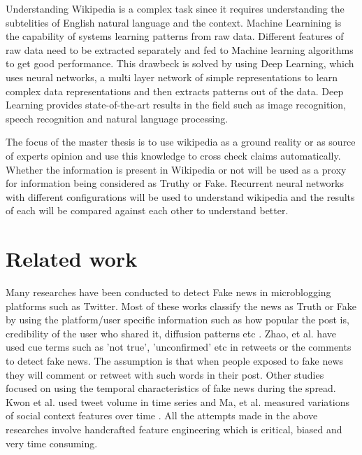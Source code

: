 \documentclass[a4paper, 11pt]{article}
\begin{document}
Understanding Wikipedia is a complex task since it requires understanding the subtelities of English natural language and the context. Machine Learnining is the capability of systems learning patterns from raw data. Different features of raw data need to be extracted separately and fed to Machine learning algorithms to get good performance. This drawbeck is solved by using Deep Learning, which uses neural networks, a multi layer network of simple representations to learn complex data representations and then extracts patterns out of the data. Deep Learning provides state-of-the-art results in the field such as image recognition, speech recognition and natural language processing\cite{Goodfellow2016}.

The focus of the master thesis is to use wikipedia as a ground reality or as source of experts opinion and use this knowledge to cross check claims automatically. Whether the information is present in Wikipedia or not will be used as a proxy for information being considered as Truthy or Fake. Recurrent neural networks with different configurations will be used to understand wikipedia and the results of each will be compared against each other to understand better.

\section{Related work}


Many researches have been conducted to detect Fake news in microblogging platforms such as Twitter. Most of these works classify the news as Truth or Fake by using the platform/user specific information such as how popular the post is, credibility of the user who shared it, diffusion patterns etc \cite{Liu2015} \cite{Ma2015}. Zhao, et al. have used cue terms such as 'not true', 'unconfirmed' etc in retweets or the comments to detect fake news. The assumption is that when people exposed to fake news they will comment or retweet with such words in their post\cite{Zhao2015}. Other studies focused on using the temporal characteristics of fake news during the spread. Kwon et al. used tweet volume in time series and Ma, et al. measured variations of social context features over time\cite{Kwon2013} \cite{Ma2015}. All the attempts made in the above researches involve handcrafted feature engineering which is critical, biased and very time consuming.
\end{document}
